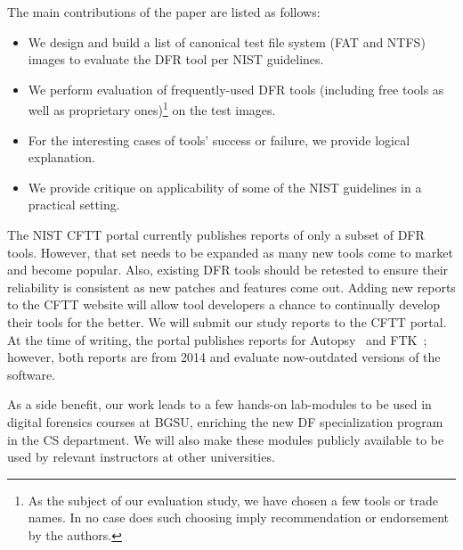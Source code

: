 \begin{paraphrase}
The main contributions of the paper are listed as follows:
\begin{itemize}
\item We design and build a list of canonical test file system (FAT and NTFS) images to evaluate the DFR tool per NIST guidelines. 
\item We perform evaluation of frequently-used DFR tools (including free tools as well as proprietary ones)\footnote{As the subject of our evaluation study, 
we have chosen a few tools or trade names. In no case does such choosing imply recommendation or endorsement by the authors.} on the test images.
\item For the interesting cases of tools' success or failure, we provide logical explanation.
\item We provide critique on applicability of some of the NIST guidelines in a practical setting. 
\end{itemize}


The NIST CFTT portal currently publishes reports of only a subset of DFR tools. 
However, that set needs to be expanded as many new tools come to market and become popular.
Also, existing DFR tools should be retested to ensure their reliability is consistent 
as new patches and features come out. 
Adding new reports to the CFTT website will allow tool developers a 
chance to continually develop their tools for the better. We will submit our study reports to the CFTT portal.
At the time of writing, the portal publishes reports for Autopsy~\cite{dhs:autopsy} and FTK~\cite{dhs:ftk}; 
however, both reports are from 2014 and evaluate now-outdated versions of the software.

As a side benefit, our work leads to a few hands-on lab-modules to be used in digital forensics courses 
at BGSU, enriching the new DF specialization program in the CS department. We will also make these modules
publicly available to be used by relevant instructors at other universities.

\end{paraphrase} 
